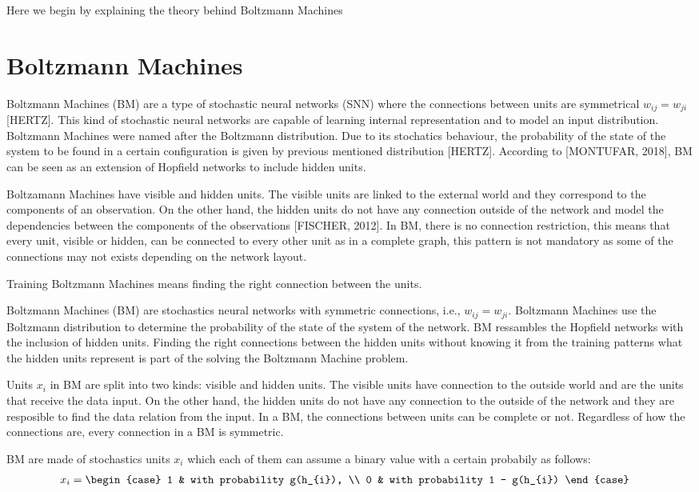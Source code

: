 Here we begin by explaining the theory behind Boltzmann Machines

\section{Boltzmann Machines}

Boltzmann Machines (BM) are a type of stochastic neural networks (SNN) where the connections between units are symmetrical $w_{ij} = w_{ji}$ [HERTZ]. This kind of stochastic neural networks are capable of learning internal representation and to model an input distribution. Boltzmann Machines were named after the Boltzmann distribution. Due to its stochatics behaviour, the probability of the state of the system to be found in a certain configuration is given by previous mentioned distribution [HERTZ]. According to [MONTUFAR, 2018], BM can be seen as an extension of Hopfield networks to include hidden units.


Boltzamann Machines have visible and hidden units. The visible units are linked to the external world and they correspond to the components of an observation. On the other hand, the hidden units do not have any connection outside of the network and model the dependencies between the components of the observations [FISCHER, 2012]. In BM, there is no connection restriction, this means that every unit, visible or hidden, can be connected to every other unit as in a complete graph, this pattern is not mandatory as some of the connections may not exists depending on the network layout.

Training Boltzmann Machines means finding the right connection between the units.


Boltzmann Machines (BM) are stochastics neural networks with symmetric connections, i.e., $w_{ij} = w_{ji}$. Boltzmann Machines use the Boltzmann distribution to determine the probability of the state of the system of the network. BM ressambles the Hopfield networks with the inclusion of hidden units. Finding the right connections between the hidden units without knowing it from the training patterns what the hidden units represent is part of the solving the Boltzmann Machine problem.

Units $x_{i}$ in BM are split into two kinds: visible and hidden units. The visible units have connection to the outside world and are the units that receive the data input. On the other hand, the hidden units do not have any connection to the outside of the network and they are resposible to find the data relation from the input. In a BM, the connections between units can be complete or not. Regardless of how the connections are, every connection in a BM is symmetric.

BM are made of stochastics units $x_{i}$ which each of them can assume a binary value with a certain probabily as follows:
\begin{align}
  x_{i} & =
    \begin{case}
      1 & with probability g(h_{i}), \\
      0 & with probability 1 - g(h_{i})
    \end{case}
  \label{eq:eq1}
\end{align}

